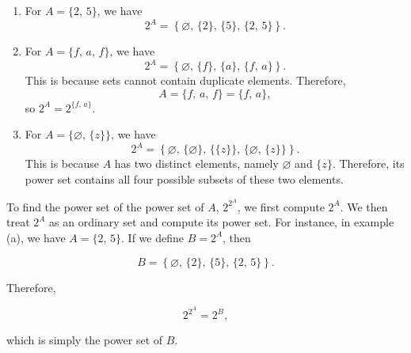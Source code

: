 \documentclass[12pt]{article}
\begin{document}
\begin{enumerate}[label=\alph*)]

    \item For $A = \{2,\,5\}$, we have
    \[
    2^A = \left\{
    \varnothing,\,
    \{2\},\,
    \{5\},\,
    \{2,\,5\}
    \right\}.
    \]

    \item For $A = \{f,\,a,\,f\}$, we have
    \[
    2^A = \left\{
    \varnothing,\,
    \{f\},\,
    \{a\},\,
    \{f,\,a\}
    \right\}.
    \]
    This is because sets cannot contain duplicate elements. Therefore,
    \[
    A = \{f,\,a,\,f\} = \{f,\,a\},
    \]
    so $2^A = 2^{\{f,\,a\}}$.

    \item For $A = \{\varnothing,\,\{z\}\}$, we have
    \[
    2^A =
    \left\{
    \varnothing,\,
    \{\varnothing\},\,
    \{\{z\}\},\,
    \{\varnothing,\,\{z\}\}
    \right\}.
    \]
    This is because $A$ has two distinct elements, namely $\varnothing$
    and $\{z\}$. Therefore, its power set contains all four possible
    subsets of these two elements.

\end{enumerate}

To find the power set of the power set of $A$, $2^{2^A}$, we first compute
$2^A$. We then treat $2^A$ as an ordinary set and compute its power set.
For instance, in example (a), we have $A = \{2,\,5\}$. If we define
$B = 2^A$, then

\[
B = \left\{
\varnothing,\,
\{2\},\,
\{5\},\,
\{2,\,5\}
\right\}.
\]

Therefore,

\[
2^{2^A} = 2^B,
\]

which is simply the power set of $B$.
\vspace{1cm}
\end{document}
